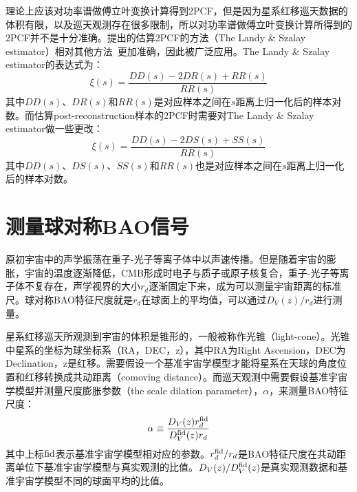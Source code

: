 理论上应该对功率谱做傅立叶变换计算得到2PCF，但是因为星系红移巡天数据的体积有限，以及巡天观测存在很多限制，所以对功率谱做傅立叶变换计算所得到的2PCF并不是十分准确。提出的估算2PCF的方法（The Landy \& Szalay estimator）相对其他方法~\cite{Peebles1974,Hewett1982,Davis1983,Hamilton1993}更加准确，因此被广泛应用。The Landy \& Szalay estimator的表达式为：
\begin{equation} \label{EQ:lsestimator}
\xi (s)=\frac {DD(s)-2DR(s)+RR(s)} {RR(s)}
\end{equation}
其中$DD(s)$、$DR(s)$和$RR(s)$是对应样本之间在$s$距离上归一化后的样本对数。而估算post-reconstruction样本的2PCF时需要对The Landy \& Szalay estimator做一些更改：
\begin{equation} \label{EQ:postreconcf}
\xi (s)=\frac {DD(s)-2DS(s)+SS(s)} {RR(s)}
\end{equation}
其中$DD(s)$、$DS(s)$、$SS(s)$和$RR(s)$也是对应样本之间在$s$距离上归一化后的样本对数。

\section{测量球对称BAO信号}
\label{sec:isobao}

原初宇宙中的声学振荡在重子-光子等离子体中以声速传播。但是随着宇宙的膨胀，宇宙的温度逐渐降低，CMB形成时电子与质子或原子核复合，重子-光子等离子体不复存在，声学视界的大小$r_d$逐渐固定下来，成为可以测量宇宙距离的标准尺。球对称BAO特征尺度就是$r_d$在球面上的平均值，可以通过$D_V(z)/r_d$进行测量。

星系红移巡天所观测到宇宙的体积是锥形的，一般被称作光锥（light-cone）。光锥中星系的坐标为球坐标系（RA，DEC，z），其中RA为Right Ascension，DEC为Declination，z是红移。需要假设一个基准宇宙学模型才能将星系在天球的角度位置和红移转换成共动距离（comoving distance）。而巡天观测中需要假设基准宇宙学模型并测量尺度膨胀参数（the scale dilation parameter），$\alpha$，来测量BAO特征尺度：
\begin{equation} \label{EQ:alpha}
\alpha \equiv \frac{D_V(z)r_{d}^{\rm fid}}{D^{\rm fid}_V(z) r_d} 
\end{equation}
其中上标${\rm fid}$表示基准宇宙学模型相对应的参数。${r_{d}^{\rm fid}}/{r_{d}}$是BAO特征尺度在共动距离单位下基准宇宙学模型与真实观测的比值。${D_V(z)}/{D_V^{\rm fid}(z)}$是真实观测数据和基准宇宙学模型不同的球面平均的比值。


